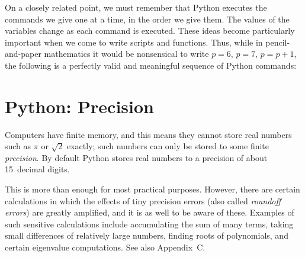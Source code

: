 On a closely related point, we must remember that Python executes the commands we
give one at a time, in the order we give them. The values of the variables change
as each command is executed. These ideas become particularly important
when we come to write scripts and functions.
Thus, while in pencil-and-paper mathematics it would be nonsensical to write $p = 6$, $p = 7$,
$p = p + 1$, the following is a perfectly valid and meaningful sequence of Python commands:











\vspace{10mm}


\section{Python: Precision}

Computers have finite memory, and this means they cannot store real numbers
such as $\pi$ or $\sqrt{2}$ exactly; such numbers can only be stored to
some finite \textit{precision}. By default Python stores real numbers to a
precision of about 15~decimal digits. 

\noindent
This is more than enough for most practical
purposes. However, there are certain calculations in which the effects of
tiny precision errors (also called \textit{roundoff errors}) are greatly
amplified, and it is as well to be aware of these.
Examples of such sensitive calculations include accumulating the sum of
many terms, taking small differences of relatively large numbers,
finding roots of polynomials, and certain eigenvalue computations.
See also Appendix~C.




